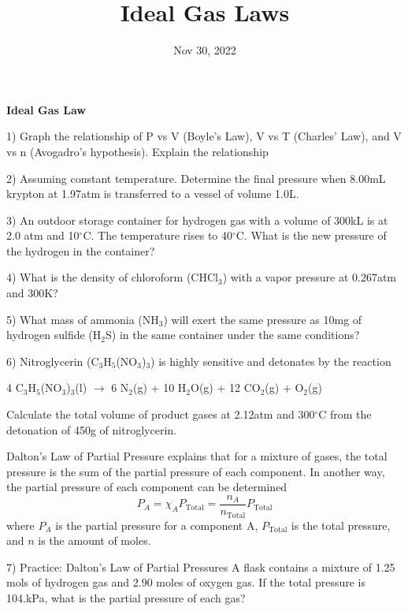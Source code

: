 \documentclass[12pt]{article}
\title{\textbf{Ideal Gas Laws}}
\date{Nov 30, 2022}
\begin{document}
\maketitle 

\textbf{Ideal Gas Law}

1) Graph the relationship of P vs V (Boyle's Law), V vs T (Charles' Law),
and V vs n (Avogadro's hypothesis). Explain the relationship

\vspace{0.25in}

2) Assuming constant temperature. Determine the final pressure when 8.00mL
krypton at 1.97atm is transferred to a vessel of volume 1.0L.

\vspace{0.25in}

3) An outdoor storage container for hydrogen gas with a volume of 300kL is
at 2.0 atm and 10$^\circ$C. The temperature rises to 40$^\circ$C. What is the
new pressure of the hydrogen in the container?

\vspace{0.25in}

4) What is the density of chloroform (CHCl$_3$) with a vapor pressure
at 0.267atm and 300K?

\vspace{0.25in}

5) What mass of ammonia (NH$_3$) will exert the same pressure as 10mg of
hydrogen sulfide (H$_2$S) in the same container under the same conditions?

\vspace{0.25in}

6) Nitroglycerin (C$_3$H$_5$(NO$_3$)$_3$) is highly sensitive and detonates
by the reaction

4 C$_3$H$_5$(NO$_3$)$_3$(l) $\rightarrow$ 6 N$_2$(g) + 10 H$_2$O(g) + 12 CO$_2$(g)
+ O$_2$(g)

Calculate the total volume of product gases at 2.12atm and 300$^\circ$C from
the detonation of 450g of nitroglycerin.

\vspace{0.25in}

Dalton's Law of Partial Pressure explains that for a mixture of gases, the
total pressure is the sum of the partial pressure of each component. In another
way, the partial pressure of each component can be determined
\begin{equation}
  P_A = \chi_A P_\text{Total} = \frac{n_A}{n_\text{Total}} P_\text{Total}
\end{equation}
where $P_A$ is the partial pressure for a component A, $P_\text{Total}$ is the total
pressure, and $n$ is the amount of moles.

7) Practice: Dalton's Law of Partial Pressures
A flask contains a mixture of 1.25 mols of hydrogen gas and 2.90 moles
of oxygen gas. If the total pressure is 104.kPa, what is the partial
pressure of each gas?
  \vspace{1.5in}
\end{document}
